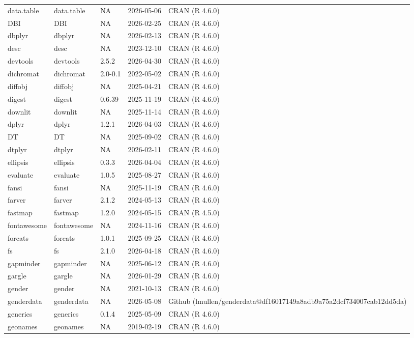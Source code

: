 \documentclass[
]{book}
\begin{document}
\begin{tabular}{lllll}
data.table & data.table & NA & 2026-05-06 & CRAN (R 4.6.0)\\
DBI & DBI & NA & 2026-02-25 & CRAN (R 4.6.0)\\
dbplyr & dbplyr & NA & 2026-02-13 & CRAN (R 4.6.0)\\
desc & desc & NA & 2023-12-10 & CRAN (R 4.6.0)\\
\addlinespace
devtools & devtools & 2.5.2 & 2026-04-30 & CRAN (R 4.6.0)\\
dichromat & dichromat & 2.0-0.1 & 2022-05-02 & CRAN (R 4.6.0)\\
diffobj & diffobj & NA & 2025-04-21 & CRAN (R 4.6.0)\\
digest & digest & 0.6.39 & 2025-11-19 & CRAN (R 4.6.0)\\
downlit & downlit & NA & 2025-11-14 & CRAN (R 4.6.0)\\
\addlinespace
dplyr & dplyr & 1.2.1 & 2026-04-03 & CRAN (R 4.6.0)\\
DT & DT & NA & 2025-09-02 & CRAN (R 4.6.0)\\
dtplyr & dtplyr & NA & 2026-02-11 & CRAN (R 4.6.0)\\
ellipsis & ellipsis & 0.3.3 & 2026-04-04 & CRAN (R 4.6.0)\\
evaluate & evaluate & 1.0.5 & 2025-08-27 & CRAN (R 4.6.0)\\
\addlinespace
fansi & fansi & NA & 2025-11-19 & CRAN (R 4.6.0)\\
farver & farver & 2.1.2 & 2024-05-13 & CRAN (R 4.6.0)\\
fastmap & fastmap & 1.2.0 & 2024-05-15 & CRAN (R 4.5.0)\\
fontawesome & fontawesome & NA & 2024-11-16 & CRAN (R 4.6.0)\\
forcats & forcats & 1.0.1 & 2025-09-25 & CRAN (R 4.6.0)\\
\addlinespace
fs & fs & 2.1.0 & 2026-04-18 & CRAN (R 4.6.0)\\
gapminder & gapminder & NA & 2025-06-12 & CRAN (R 4.6.0)\\
gargle & gargle & NA & 2026-01-29 & CRAN (R 4.6.0)\\
gender & gender & NA & 2021-10-13 & CRAN (R 4.6.0)\\
genderdata & genderdata & NA & 2026-05-08 & Github (lmullen/genderdata@df16017149a8adb9a75a2dcf734007cab12dd5da)\\
\addlinespace
generics & generics & 0.1.4 & 2025-05-09 & CRAN (R 4.6.0)\\
geonames & geonames & NA & 2019-02-19 & CRAN (R 4.6.0)\\

\end{tabular}
\end{document}
